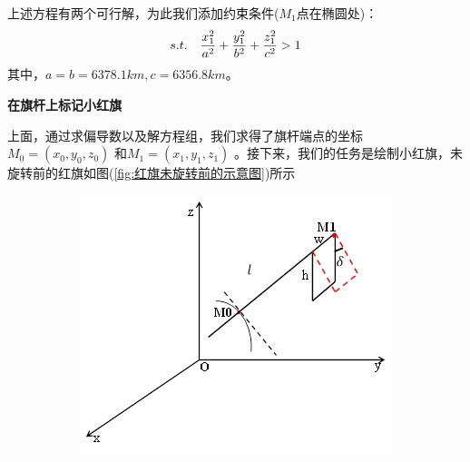             上述方程有两个可行解，为此我们添加约束条件($M_1$点在椭圆处)：
            \begin{equation*}
            \centering
            s.t.\quad \frac{x_1^2}{ a^2}+\frac{y_1^2}{b^2}+\frac{z_1^2}{c^2}>1
             \end{equation*}
            其中，$a=b=6378.1km,c=6356.8km$。
            \par
            \checkmark \textbf {在旗杆上标记小红旗}
            \par
            上面，通过求偏导数以及解方程组，我们求得了旗杆端点的坐标$M_0=(x_0,y_0,z_0)$ 和$M_1=(x_1,y_1,z_1)$ 。接下来，我们的任务是绘制小红旗，未旋转前的红旗如图(\ref{fig:红旗未旋转前的示意图})所示
           \begin{figure}[H]
                \centering
                \begin{subfigure}[b]{0.25\textwidth}
                    \includegraphics[width=\textwidth]{images/7.jpg}
                    \caption{}
                     \label{fig:红旗未旋转前的示意图小}
                \end{subfigure}
                \qquad
                \begin{subfigure}[b]{0.25\textwidth}

\end{subfigure}
\end{figure}
